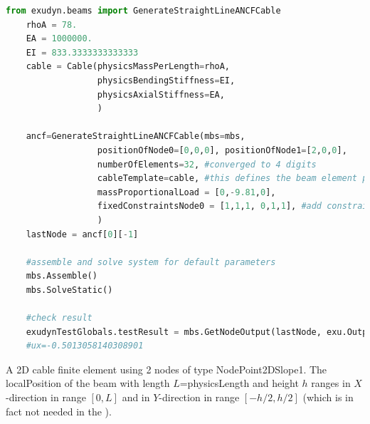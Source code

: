 \begin{lstlisting}[language=Python, firstnumber=1]
    from exudyn.beams import GenerateStraightLineANCFCable
    rhoA = 78.
    EA = 1000000.
    EI = 833.3333333333333
    cable = Cable(physicsMassPerLength=rhoA, 
                  physicsBendingStiffness=EI, 
                  physicsAxialStiffness=EA, 
                  )

    ancf=GenerateStraightLineANCFCable(mbs=mbs,
                  positionOfNode0=[0,0,0], positionOfNode1=[2,0,0],
                  numberOfElements=32, #converged to 4 digits
                  cableTemplate=cable, #this defines the beam element properties
                  massProportionalLoad = [0,-9.81,0],
                  fixedConstraintsNode0 = [1,1,1, 0,1,1], #add constraints for pos and rot (r'_y,r'_z)
                  )
    lastNode = ancf[0][-1]

    #assemble and solve system for default parameters
    mbs.Assemble()
    mbs.SolveStatic()

    #check result
    exudynTestGlobals.testResult = mbs.GetNodeOutput(lastNode, exu.OutputVariableType.Displacement)[0]
    #ux=-0.5013058140308901
\end{lstlisting}

\newpage


\label{sec:item:ObjectANCFCable2D}
A 2D cable finite element using 2 nodes of type NodePoint2DSlope1. The localPosition of the beam with length $L$=physicsLength and height $h$ ranges in $X$-direction in range $[0, L]$ and in $Y$-direction in range $[-h/2,h/2]$ (which is in fact not needed in the ).
\vspace{12pt}\\

